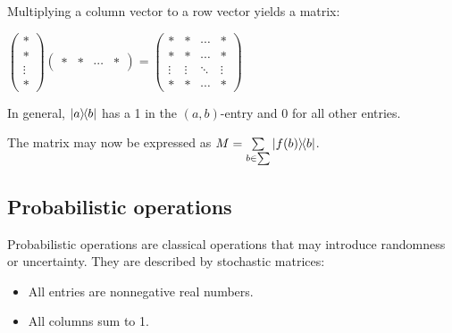 \documentclass{report}
\begin{document}
Multiplying a column vector to a row vector yields a matrix:
\begin{center}
    $\begin{pmatrix}
        * \\
        * \\
        \vdots \\
        *
    \end{pmatrix}
        \begin{pmatrix}
        * & * & \cdots & *
    \end{pmatrix}
    =
    \begin{pmatrix}
        * & * & \cdots & * \\
        * & * & \cdots & * \\
        \vdots & \vdots & \ddots & \vdots \\
        * & * & \cdots & *
    \end{pmatrix}$
\end{center}

In general, $\ket{a}\hspace{-0.3em}\bra{b}$ has a 1 in the $(a,b)$-entry and 0 for all other entries.

\bigbreak

The matrix may now be expressed as $M=\sum\limits_{b\in\sum}\ket{f(b)}\hspace{-0.3em}\bra{b}$.

\subsection{Probabilistic operations}
Probabilistic operations are classical operations that may introduce randomness or uncertainty. They are described by stochastic matrices:
\begin{itemize}
    \item All entries are nonnegative real numbers.
    \item All columns sum to 1.
\end{itemize}

\end{document}
